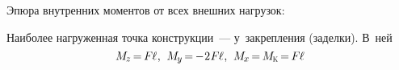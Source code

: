 \documentclass[14pt]{extarticle}
\begin{document}
\newpage

Эпюра внутренних моментов от всех внешних нагрузок:

\begin{center}

\end{center}

\vspace{.5cm}

Наиболее нагруженная точка конструкции~--- у~закрепления (заделки).
В~ней
\nopagebreak\vspace{-.8em}\[
M_{\hspace{-0.1ex}\scalebox{.8}{$z$}} \hspace{-.25ex}
= \hspace{-.2ex} F \hspace{-0.1ex} \ell
\hspace{.1ex} , \hspace{.4em}
M_{\hspace{-0.1ex}\scalebox{.8}{$y$}} \hspace{-.25ex}
= \hspace{-.2ex} - \hspace{.1ex} 2 \hspace{.1ex} F \hspace{-0.1ex} \ell
\hspace{.1ex} , \hspace{.4em}
M_{\hspace{-0.1ex}\scalebox{.8}{$x$}} \hspace{-.25ex}
= \hspace{-.2ex}
M_{\hspace{-0.1ex}\mathrm{\scalebox{.6}{K}}} \hspace{-.25ex}
= \hspace{-.2ex} F \hspace{-0.1ex} \ell
\]
\end{document}
